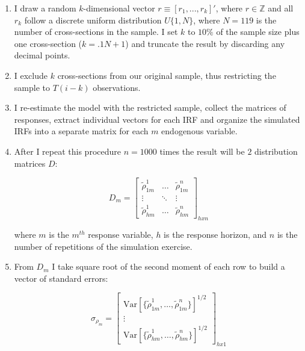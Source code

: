 \documentclass{article}
\begin{document}
\begin{enumerate}
    \item I draw a random $k$-dimensional vector $r \equiv [r_1 , ... , r_k]'$, where $r \in \mathbb{Z}$ and all $r_k$ follow a discrete uniform distribution $U\{1,N\}$, where $N = 119$ is the number of cross-sections in the sample. I set $k$ to $10\%$ of the sample size plus one cross-section ($k = .1N + 1$) and truncate the result by discarding any decimal points.
    \item I exclude $k$ cross-sections from our original sample, thus restricting  the sample to $T(i-k)$ observations.
    \item I re-estimate the model with the restricted sample, collect the matrices of responses, extract individual vectors for each IRF and organize the simulated IRFs into a separate matrix for each $m$ endogenous variable.
    \item After I repeat this procedure $n = 1000$ times the result will be $2$ distribution matrices $D$: 

\begin{equation}
    D_m = 
    \begin{bmatrix}
        \tilde{\rho}^1_{1m} & \hdots & \tilde{\rho}^n_{1m} \\
        \vdots & \ddots & \vdots \\
        \tilde{\rho}^1_{hm} & \hdots & \tilde{\rho}^n_{hm} 
    \end{bmatrix}_{hxn}
\end{equation}

where $m$ is the $m^{th}$ response variable, $h$ is the response horizon, and $n$ is the number of repetitions of the simulation exercise.

\item From $D_m$ I take square root of the second moment of each row to build a vector of standard errors: 

\begin{equation}
    \sigma_{\rho_{m}} = 
    \begin{bmatrix}
        \text{Var}[\{\tilde{\rho}^1_{1m} , \hdots, \tilde{\rho}^n_{1m}\}]^{1/2} \\
        \vdots\\
        \text{Var}[\{\tilde{\rho}^1_{hm}, \hdots, \tilde{\rho}^n_{hm}\}]^{1/2} 
    \end{bmatrix}_{hx1}
\end{equation}
\end{enumerate}
\end{document}
